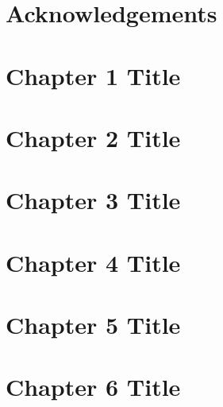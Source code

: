 \documentclass[12pt]{report}
\begin{document}
\begin{justify}


\chapter*{Acknowledgements}


\begin{spacing}{1.0}
\tableofcontents 
    \newpage
    
\listoffigures
    \newpage

\listoftables
\end{spacing}
    \newpage

    \setcounter{page}{1}
    
\chapter{Chapter 1 Title}


\chapter{Chapter 2 Title}


\chapter{Chapter 3 Title}


\chapter{Chapter 4 Title}


\chapter{Chapter 5 Title}


\chapter{Chapter 6 Title}


\begin{spacing}{1.0}
    \printbibliography
\end{spacing}

\begin{appendices}

\end{appendices}
\end{justify}
\end{document}
